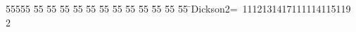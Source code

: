 %
%
\begin{tabbing}
55555 \= 55 \= 55 \= 55 \= 55 \= 55 \= 55 \= 55 \= 55 \= 55 \= 55 \= 55 \= 55 \= \>Dickson2=\ 1112131417111114115119\\[0pt]
2\>\end{tabbing}
